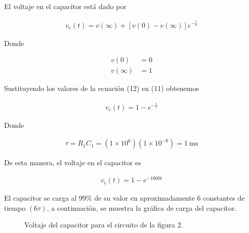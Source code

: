 \documentclass{article}
\begin{document}
El voltaje en el capacitor está dado por

\begin{align}
	v_c(t) = v(\infty) + \left[ v(0) - v(\infty) \right]e^{-\frac{t}{\tau}}
\end{align}

Donde

\begin{subequations}
	\begin{align}
		v(0) &= 0 \label{second:a} \\
		v(\infty) &= 1 \label{second:b}
	\end{align}
\end{subequations}

Sustituyendo los valores de la ecuación (12) en (11) obtenemos

\begin{align}
	v_c(t) = 1 - e^{-\frac{t}{\tau}}
\end{align}

Donde

\begin{align}
	\tau = R_1C_1 = (1 \times 10^6)(1 \times 10^{-9}) = \qty{1}{\milli \second}
\end{align}

De esta manera, el voltaje en el capacitor es

\begin{align}
	v_c(t) = 1 - e^{-1000t}
\end{align}

El capacitor se carga al 99\% de su valor en aproximadamente 6 constantes de tiempo $(6\tau)$, a continuación, se muestra la gráfica de carga del capacitor.
	
\begin{figure}[H]
\centering	
{}
\caption{Voltaje del capacitor para el circuito de la figura 2.}	
\label{fig:figura3}
\end{figure}
\end{document}
